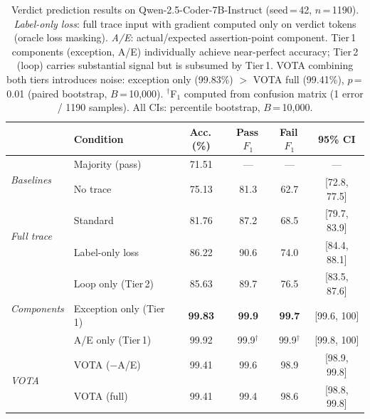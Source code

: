 



\begin{table}[t]
\centering
\small
\begin{tabular}{@{}llcccc@{}}
\toprule
& \textbf{Condition} & \textbf{Acc.\,(\%)} & \textbf{Pass\,$F_1$} & \textbf{Fail\,$F_1$} & \textbf{95\% CI} \\
\midrule
\multirow{2}{*}{\textit{Baselines}}
& Majority (pass)           & 71.51 & ---   & ---   & --- \\
& No trace                  & 75.13 & 81.3  & 62.7  & [72.8, 77.5] \\
\midrule
\multirow{2}{*}{\textit{Full trace}}
& Standard                  & 81.76 & 87.2  & 68.5  & [79.7, 83.9] \\
& Label-only loss            & 86.22 & 90.6  & 74.0  & [84.4, 88.1] \\
\midrule
\multirow{3}{*}{\textit{Components}}
& Loop only (Tier\,2)       & 85.63 & 89.7  & 76.5  & [83.5, 87.6] \\
& Exception only (Tier\,1)  & \textbf{99.83} & \textbf{99.9}  & \textbf{99.7}  & [99.6, 100] \\
& A/E only (Tier\,1)        & 99.92 & 99.9$^\dagger$  & 99.9$^\dagger$ & [99.8, 100] \\
\midrule
\multirow{2}{*}{\textit{VOTA}}
& VOTA ($-$A/E)             & 99.41 & 99.6  & 98.9  & [98.9, 99.8] \\
& VOTA (full)               & 99.41 & 99.4  & 98.6  & [98.8, 99.8] \\
\bottomrule
\end{tabular}
\caption{
Verdict prediction results on Qwen-2.5-Coder-7B-Instruct (seed\,=\,42, $n$\,=\,1190).
\textit{Label-only loss}: full trace input with gradient computed only on verdict tokens (oracle loss masking).
\textit{A/E}: actual/expected assertion-point component.
Tier\,1 components (exception, A/E) individually achieve near-perfect accuracy;
Tier\,2 (loop) carries substantial signal but is subsumed by Tier\,1.
VOTA combining both tiers introduces noise: exception only (99.83\%) $>$ VOTA full (99.41\%), $p$\,=\,0.01 (paired bootstrap, $B$\,=\,10{,}000).
$^\dagger$F$_1$ computed from confusion matrix (1 error / 1190 samples).
All CIs: percentile bootstrap, $B$\,=\,10{,}000.
}
\label{tab:main-results}
\end{table}


